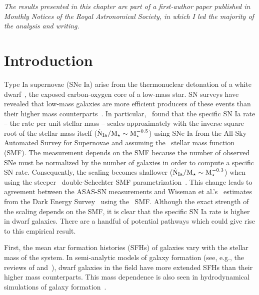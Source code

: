 
\begin{center}
\textit{
	The results presented in this chapter are part of a first-author paper
	published in Monthly Notices of the Royal Astronomical Society, in which I
	led the majority of the analysis and writing.
}
\end{center}

\section{Introduction}
\label{iarates:sec:intro}
Type Ia supernovae (SNe Ia) arise from the thermonuclear detonation of a white
dwarf~\citep[WD;][]{Hoyle1960, Colgate1969}, the exposed carbon-oxygen core of
a low-mass star.
SN surveys have revealed that low-mass galaxies are more efficient producers
of these events than their higher mass counterparts~\citep[e.g.,][]{Mannucci2005,
Sullivan2006, Li2011, Smith2012}.
In particular,~\citet{Brown2019} found that the specific SN Ia rate -- the rate
per unit stellar mass -- scales approximately with the inverse square root of
the stellar mass itself ($\dot{\text{N}}_\text{Ia} / \text{M}_\star \sim \text{M}_\star^{-0.5}$)
using SNe Ia from the All-Sky Automated Survey for Supernovae
\citep[ASAS-SN;][]{Shappee2014, Kochanek2017} and assuming the~\citet{Bell2003}
stellar mass function (SMF).
The measurement depends on the SMF because the number of
observed SNe must be normalized by the number of galaxies in order to compute a
specific SN rate.
Consequently, the scaling becomes shallower ($\dot{\text{N}}_\text{Ia} / \text{M}_\star
\sim \text{M}_\star^{-0.3}$) when using the steeper~\citet{Baldry2012} double-Schechter
SMF parametrization~\citep{Gandhi2022}.
This change leads to agreement between the ASAS-SN measurements and Wiseman et
al.'s~\citeyearpar{Wiseman2021} estimates from the Dark Energy
Survey~\citep[DES;][]{DarkEnergySurveyCollaboration2016} using
the~\citet{Baldry2012} SMF.
Although the exact strength of the scaling depends on the SMF, it is clear
that the specific SN Ia rate is higher in dwarf galaxies.
There are a handful of potential pathways which could give rise to this
empirical result.
\par
First, the mean star formation histories (SFHs) of galaxies vary with the
stellar mass of the system.
In semi-analytic models of galaxy formation (see, e.g., the reviews of
\citealt{Baugh2006} and~\citealt{Somerville2015a}), dwarf galaxies in the field
have more extended SFHs than their higher mass counterparts.
This mass dependence is also seen in hydrodynamical simulations of galaxy
formation~\citep[e.g.,][]{GarrisonKimmel2019}.
